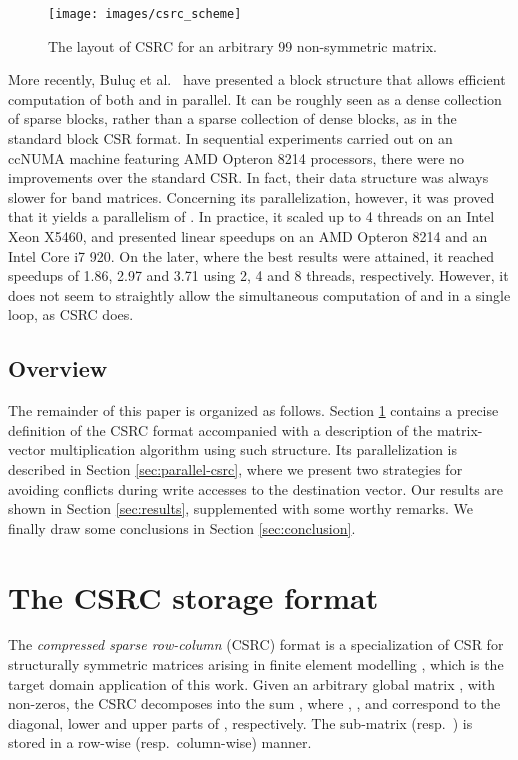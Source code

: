 \documentclass[11pt]{article}
\begin{document}
\begin{figure}[!t]
\centering
\texttt{[image: images/csrc\_scheme]}
\caption{The layout of CSRC for an arbitrary 99 non-symmetric matrix.}
\label{fig:csrc_scheme}
\end{figure}

More recently, Bulu{\c{c}} et al.~\cite{BFFGL09a} have presented a block structure that allows
efficient computation of both  and  in parallel.  It can
be roughly seen as a dense collection of sparse blocks, rather than a sparse
collection of dense blocks, as in the standard block CSR format.  In
sequential experiments carried out on an ccNUMA machine featuring AMD Opteron 8214
processors, there were no improvements over the standard CSR.
In fact, their data structure was always slower for band matrices.  Concerning
its parallelization, however, it was proved that it yields a
parallelism of .
In practice, it scaled up to 4 threads on an Intel Xeon X5460, and
presented linear speedups on an AMD Opteron 8214 and an Intel Core i7 920.  On
the later, where the best results were attained, it reached speedups of 1.86,
2.97 and 3.71 using 2, 4 and 8 threads, respectively. However,
it does not seem to straightly allow the simultaneous
computation of  and  in a single loop, as CSRC does.

\subsection{Overview}

The remainder of this paper is organized as follows.  Section \ref{sec:csrc}
contains a precise definition of the CSRC format accompanied with a description
of the matrix-vector multiplication algorithm using such structure.  Its
parallelization is described in Section \ref{sec:parallel-csrc}, where we
present two strategies for avoiding conflicts during write accesses to
the destination vector.  Our results are shown in Section \ref{sec:results},
supplemented with some worthy remarks.  We finally draw some conclusions in
Section \ref{sec:conclusion}.

\section{The CSRC storage format}
\label{sec:csrc}

The \textit{compressed sparse row-column} (CSRC) format is a specialization of
CSR for structurally symmetric matrices arising in finite element modelling
\cite{RF07a}, which is the target domain application of this work.  Given an
arbitrary  global matrix , with 
non-zeros, the CSRC decomposes  into the sum , where ,
, and  correspond to the diagonal, lower and upper parts of ,
respectively.  The sub-matrix  (resp.~) is stored in a row-wise
(resp.~column-wise) manner.
\end{document}
